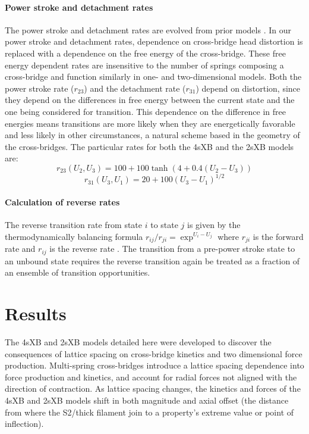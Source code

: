 \documentclass[11pt,titlepage]{article}
\begin{document}
\paragraph{Power stroke and detachment rates} %
The power stroke and detachment rates are evolved from prior models \citep{Pate1989, Tanner2007}. 
In our power stroke and detachment rates, dependence on cross-bridge head distortion is replaced with a dependence on the free energy of the cross-bridge.
These free energy dependent rates are insensitive to the number of springs composing a cross-bridge and function similarly in one- and two-dimensional models. 
Both the power stroke rate ($r_{23}$) and the detachment rate ($r_{31}$) depend on distortion, since they depend on the differences in free energy between the current state and the one being considered for transition.  
This dependence on the difference in free energies means transitions are more likely when they are energetically favorable and less likely in other circumstances, a natural scheme based in the geometry of the cross-bridges.
The particular rates for both the 4sXB and the 2sXB models are: 
$$r_{23}(U_2, U_3) = 100 + 100\tanh(4 + 0.4 (U_2 - U_3)) $$
$$r_{31}(U_3, U_1) = 20 + 100 (U_3 - U_1)^{1/2} $$

\paragraph{Calculation of reverse rates} %
The reverse transition rate from state $i$ to state $j$ is given by the thermodynamically balancing formula $r_{ij}/r_{ji}=\exp^{U_i-U_j}$ where $r_{ji}$ is the forward rate and $r_{ij}$ is the reverse rate \citep{Pate1989, Daniel1998, Tanner2007}.
The transition from a pre-power stroke state to an unbound state requires the reverse transition again be treated as a fraction of an ensemble of transition opportunities. 



\section*{Results} %

The 4sXB and 2sXB models detailed here were developed to discover the consequences of lattice spacing on cross-bridge kinetics and two dimensional force production.
Multi-spring cross-bridges introduce a lattice spacing dependence into force production and kinetics, and account for radial forces not aligned with the direction of contraction. 
As lattice spacing changes, the kinetics and forces of the 4sXB and 2sXB models shift in both magnitude and axial offset (the distance from where the S2/thick filament join to a property's extreme value or point of inflection).
\end{document}
